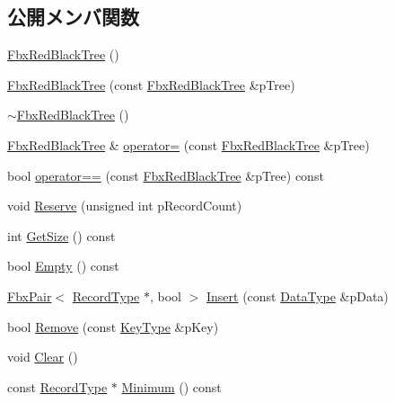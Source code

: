 \subsection*{公開メンバ関数}
\begin{DoxyCompactItemize}
\item 
\hyperlink{class_fbx_red_black_tree_a53f5ee11b3aa618b7ebc7b2ff1654d40}{Fbx\+Red\+Black\+Tree} ()
\item 
\hyperlink{class_fbx_red_black_tree_a2c4ff0fca7f156a399bc83d3e8822485}{Fbx\+Red\+Black\+Tree} (const \hyperlink{class_fbx_red_black_tree}{Fbx\+Red\+Black\+Tree} \&p\+Tree)
\item 
\hyperlink{class_fbx_red_black_tree_ae12987fd6ad76bbb3b65bb3aeebb449c}{$\sim$\+Fbx\+Red\+Black\+Tree} ()
\item 
\hyperlink{class_fbx_red_black_tree}{Fbx\+Red\+Black\+Tree} \& \hyperlink{class_fbx_red_black_tree_aad39327aec57c013f40b53e5613ecb5b}{operator=} (const \hyperlink{class_fbx_red_black_tree}{Fbx\+Red\+Black\+Tree} \&p\+Tree)
\item 
bool \hyperlink{class_fbx_red_black_tree_a40aebf09d104a56e1e6724ac7acb66b9}{operator==} (const \hyperlink{class_fbx_red_black_tree}{Fbx\+Red\+Black\+Tree} \&p\+Tree) const
\item 
void \hyperlink{class_fbx_red_black_tree_a707730fca6c73fea996c8354a0a6ead2}{Reserve} (unsigned int p\+Record\+Count)
\item 
int \hyperlink{class_fbx_red_black_tree_a99b4a611074bfd7b5a5165ca9cd9b14b}{Get\+Size} () const
\item 
bool \hyperlink{class_fbx_red_black_tree_ab885c9a32cffb04da71d5dccb70bc945}{Empty} () const
\item 
\hyperlink{class_fbx_pair}{Fbx\+Pair}$<$ \hyperlink{class_fbx_red_black_tree_1_1_record_type}{Record\+Type} $\ast$, bool $>$ \hyperlink{class_fbx_red_black_tree_ab5f48f09ad534b7a11a45a4abe461b87}{Insert} (const \hyperlink{class_fbx_red_black_tree_a9bd3feb4c82e7d105bc475f01a9a199d}{Data\+Type} \&p\+Data)
\item 
bool \hyperlink{class_fbx_red_black_tree_a432f0ed569c5ccb0273c583e59414b0b}{Remove} (const \hyperlink{class_fbx_red_black_tree_a241b31c6972995417d193458b7bb27e2}{Key\+Type} \&p\+Key)
\item 
void \hyperlink{class_fbx_red_black_tree_aa762c1d9c1b533045066f713def691e2}{Clear} ()
\item 
const \hyperlink{class_fbx_red_black_tree_1_1_record_type}{Record\+Type} $\ast$ \hyperlink{class_fbx_red_black_tree_a9a4565bfb7656d449804fca9a8e56fa1}{Minimum} () const

\end{DoxyCompactItemize}
